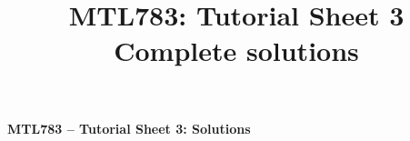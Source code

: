 \documentclass[11pt,a4paper]{article}
\title{\textbf{MTL783: Tutorial Sheet 3}\\[0.3em]\large Complete solutions}
\date{}
\begin{document}
{\centering\Large\bfseries MTL783 -- Tutorial Sheet 3: Solutions\par}





\end{document}
